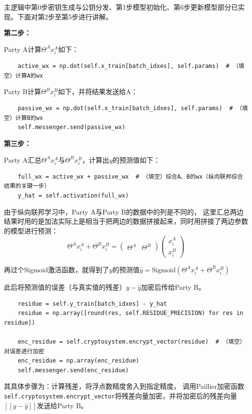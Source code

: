 \documentclass[twoside,11pt]{article}
\begin{document}
主逻辑中第0步密钥生成与公钥分发、第1步模型初始化、第6步更新模型部分已实现。下面对第2步至第5步进行讲解。

\textbf{第二步：}

Party A计算$\Theta^A x_i^A$如下：
\begin{lstlisting}
    active_wx = np.dot(self.x_train[batch_idxes], self.params)  # （填空）计算A的wx
\end{lstlisting}

Party B计算$\Theta^B x_i^B$如下，并将结果发送给A：
\begin{lstlisting}
    passive_wx = np.dot(self.x_train[batch_idxes], self.params)  # （填空）计算B的wx
    self.messenger.send(passive_wx)
\end{lstlisting}

\textbf{第三步：}

Party A汇总$\Theta^A x_i^A$与$\Theta^B x_i^B$，计算出$y$的预测值如下：
\begin{lstlisting}
    full_wx = active_wx + passive_wx  # （填空）综合A、B的wx（纵向联邦综合结果的关键一步）
    y_hat = self.activation(full_wx)
\end{lstlisting}

由于纵向联邦学习中，Party A与Party B的数据中的列是不同的，
这里汇总两边结果时用的是加法实际上是相当于把两边的数据拼接起来，同时用拼接了两边参数的模型进行预测：
$$
    \Theta^A x_i^A + \Theta^B x_i^B =
    \begin{pmatrix}
        \Theta^A & \Theta^B
    \end{pmatrix}
    \begin{pmatrix}
        x_i^A \\
        x_i^B
    \end{pmatrix}
$$

再过个Sigmoid激活函数，就得到了$y$的预测值$\hat{y}=\mathrm{Sigmoid}(\Theta^A x_i^A + \Theta^B x_i^B)$

此后将预测值的误差（与真实值的残差）$y-\hat{y}$加密后传给Party B。
\begin{lstlisting}
    residue = self.y_train[batch_idxes] - y_hat
    residue = np.array([round(res, self.RESIDUE_PRECISION) for res in residue])

    enc_residue = self.cryptosystem.encrypt_vector(residue)  # （填空）对误差进行加密
    enc_residue = np.array(enc_residue)
    self.messenger.send(enc_residue)
\end{lstlisting}
其具体步骤为：计算残差，将浮点数精度舍入到指定精度，
调用Paillier加密函数\texttt{self.cryptosystem.encrypt_vector}将残差向量加密，并将加密后的残差向量$[[ y-\hat{y} ]]$发送给Party B。
\end{document}
